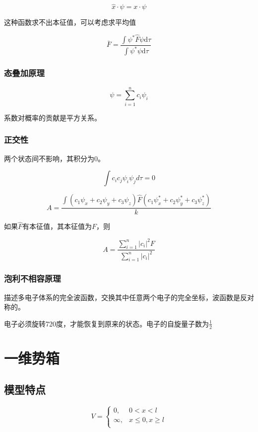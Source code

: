 \documentclass[a4paper]{ctexrep}
\renewcommand{\d}{\mathrm{d}}
\begin{document}
    \[
        \hat{x} \cdot \psi = x \cdot \psi  
    \]

    这种函数求不出本征值，可以考虑求平均值

    \[
        \bar{F} = \frac{\int \psi^* \hat{F} \psi \d \tau}{\int \psi^* \psi \d \tau}
    \]

    \subsubsection{态叠加原理}

    \[
        \psi = \sum_{i=1}^n c_i \psi_i
    \]

    系数对概率的贡献是平方关系。


    \subsubsection{正交性}

    两个状态间不影响，其积分为0。

    \[
       \int c_ic_j \psi_i \psi_j d\tau = 0
    \]

    \[
       A = \frac{\int (c_1 \psi_x + c_2 \psi_y + c_3 \psi_z) \hat{F} (c_1 \psi_x^* + c_2 \psi_y^* + c_3 \psi_z^*)}{k} 
    \]

    如果$\hat{F}$有本征值，其本征值为$F$，则

    \[
        A = \frac{\sum\limits_{i=1}^n |c_i|^2 F }{ \sum\limits_{i=1}^n |c_i|^2 } 
    \] 
    

    \subsubsection{泡利不相容原理}

    描述多电子体系的完全波函数，交换其中任意两个电子的完全坐标，波函数是反对称的。

    电子必须旋转720度，才能恢复到原来的状态。电子的自旋量子数为$\frac{1}{2}$


    \section{一维势箱}

    \subsection{模型特点}

    \[
        V = \begin{cases}
            0, & 0 < x < l \\
            \infty, & x \le 0, x \ge l \\
        \end{cases} 
    \]
\end{document}

